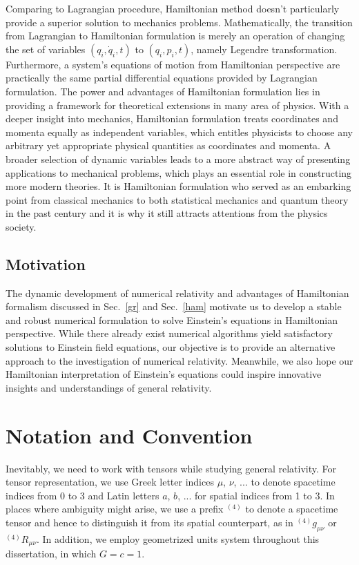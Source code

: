 Comparing to Lagrangian procedure, Hamiltonian method doesn't particularly provide a superior solution to mechanics problems. Mathematically, the transition from Lagrangian to Hamiltonian formulation is merely an operation of changing the set of variables $(q_{i}, {\dot q}_{i}, t)$ to $(q_{i}, p_{i}, t)$, namely Legendre transformation. Furthermore, a system's equations of motion from Hamiltonian perspective are practically the same partial differential equations provided by Lagrangian formulation. The power and advantages of Hamiltonian formulation lies in providing a framework for theoretical extensions in many area of physics. With a deeper insight into mechanics, Hamiltonian formulation treats coordinates and momenta equally as independent variables, which entitles physicists to choose any arbitrary yet appropriate physical quantities as coordinates and momenta. A broader selection of dynamic variables leads to a more abstract way of presenting applications to mechanical problems, which plays an essential role in constructing more modern theories. It is Hamiltonian formulation who served as an embarking point from classical mechanics to both statistical mechanics and quantum theory in the past century and it is why it still attracts attentions from the physics society\cite{goldstein}. 
\subsection{Motivation}
The dynamic development of numerical relativity and advantages of Hamiltonian formalism discussed in Sec.~\ref{gr} and Sec.~\ref{ham} motivate us to develop a stable and robust numerical formulation to solve Einstein's equations in Hamiltonian perspective. While there already exist numerical algorithms yield satisfactory solutions to Einstein field equations, our objective is to provide an alternative approach to the investigation of numerical relativity. Meanwhile, we also hope our Hamiltonian interpretation of Einstein's equations could inspire innovative insights and understandings of general relativity. 
\section{Notation and Convention}\label{notation}
Inevitably, we need to work with tensors while studying general relativity. For tensor representation, we use Greek letter indices $\mu$, $\nu$, ... to denote spacetime indices from 0 to 3 and Latin letters $a$, $b$, ... for spatial indices from 1 to 3. In places where ambiguity might arise, we use a prefix $^{(4)}$ to denote a spacetime tensor and hence to distinguish it from its spatial counterpart, as in $^{(4)}g_{\mu\nu}$ or $^{(4)}R_{\mu\nu}$. In addition, we employ geometrized  units system throughout this dissertation, in which $G = c = 1$.

